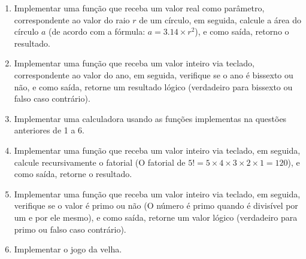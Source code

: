 \documentclass[11pt]{article}
\begin{document}
\begin{enumerate}
	\item Implementar uma função que receba um valor real como parâmetro, correspondente ao valor
	do raio $r$ de um círculo, em seguida, calcule a área do círculo $a$ (de acordo com a fórmula:
	$a = 3.14 × r^{2}$), e como saída, retorno o resultado.
	
	\item Implementar uma função que receba um valor inteiro via teclado, correspondente ao valor do
	ano, em seguida, verifique se o ano é bissexto ou não, e como saída, retorne um resultado lógico
	(verdadeiro para bissexto ou falso caso contrário).
	
	\item  Implementar uma calculadora usando as funções implementas na questões anteriores de 1 a 6.
	
	\item Implementar uma função que receba um valor inteiro via teclado, em seguida, calcule
	recursivamente o fatorial (O fatorial de $5! = 5 \times 4 \times 3 \times 2 \times 1 = 120$), e como saída, retorne o
	resultado.
	
	\item  Implementar uma função que receba um valor inteiro via teclado, em seguida, verifique se o valor
	é primo ou não (O número é primo quando é divisível por um e por ele mesmo), e como saída,
	retorne um valor lógico (verdadeiro para primo ou falso caso contrário).
	
	\item Implementar o jogo da velha.
\end{enumerate}
\end{document}

